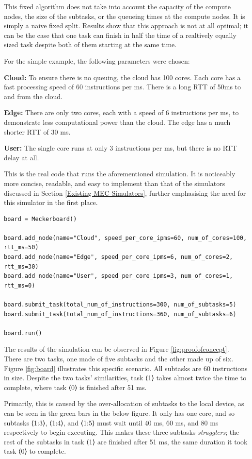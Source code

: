 \documentclass[]{UCD_CS_Interim_Report}
\begin{document}
This fixed algorithm does not take into account the capacity of the compute nodes, the size of the subtasks, or the queueing times at the compute nodes. It is simply a naive fixed split. Results show that this approach is not at all optimal; it can be the case that one task can finish in half the time of a realtively equally sized task despite both of them starting at the same time.

For the simple example, the following parameters were chosen:

\textbf{Cloud:} To ensure there is no queuing, the cloud has 100 cores. Each core has a fast processing speed of 60 instructions per ms. There is a long RTT of 50ms to and from the cloud.

\textbf{Edge:} There are only two cores, each with a speed of 6 instructions per ms, to demonstrate less computational power than the cloud. The edge has a much shorter RTT of 30 ms.

\textbf{User:} The single core runs at only 3 instructions per ms, but there is no RTT delay at all.
    
This is the real code that runs the aforementioned simulation. It is noticeably more concise, readable, and easy to implement than that of the simulators discussed in Section \ref{Existing MEC Simulators}, further emphasising the need for this simulator in the first place.

\begin{verbatim}
board = Meckerboard()

board.add_node(name="Cloud", speed_per_core_ipms=60, num_of_cores=100, rtt_ms=50)
board.add_node(name="Edge", speed_per_core_ipms=6, num_of_cores=2, rtt_ms=30)
board.add_node(name="User", speed_per_core_ipms=3, num_of_cores=1, rtt_ms=0)

board.submit_task(total_num_of_instructions=300, num_of_subtasks=5)
board.submit_task(total_num_of_instructions=360, num_of_subtasks=6)

board.run()
\end{verbatim}

The results of the simulation can be observed in Figure \ref{fig:proofofconcept}. There are two tasks, one made of five subtasks and the other made up of six. Figure \ref{fig:board} illustrates this specific scenario. All subtasks are 60 instructions in size. Despite the two tasks' similarities, task ⟨1⟩ takes almost twice the time to complete, where task ⟨0⟩ is finished after 51 ms.

Primarily, this is caused by the over-allocation of subtasks to the local device, as can be seen in the green bars in the below figure. It only has one core, and so subtasks ⟨1:3⟩, ⟨1:4⟩, and ⟨1:5⟩ must wait until 40 ms, 60 ms, and 80 ms respectively to begin executing. This makes these three subtasks \textit{stragglers}; the rest of the subtasks in task ⟨1⟩ are finished after 51 ms, the same duration it took task ⟨0⟩ to complete.
\end{document}
